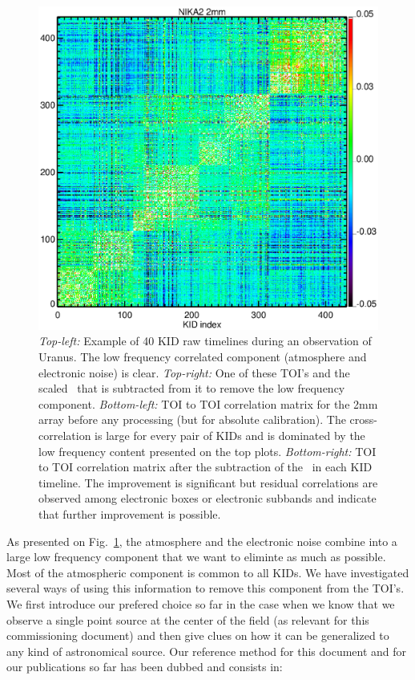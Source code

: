 \begin{figure}[hhh]
\begin{center}
\includegraphics[clip, angle=0, scale=0.4]{Figures/matrix_2mm_decorr.eps}
\caption{\emph{Top-left:} Example of 40 KID raw timelines during an observation
  of Uranus. The low frequency correlated component (atmosphere and electronic
  noise) is clear. \emph{Top-right:} One of these TOI's and the scaled
\cm\ that is subtracted from it to remove the low frequency
component. \emph{Bottom-left:} TOI to TOI correlation matrix for the 2mm array
before any processing (but for absolute calibration). The cross-correlation is
large for every pair of KIDs and is dominated by the low frequency content
presented on the top plots. \emph{Bottom-right:} TOI to TOI correlation matrix
after the subtraction of the \cm\ in each KID timeline. The improvement is
significant but residual correlations are observed among electronic boxes or
electronic subbands and indicate that further improvement is possible.}
\label{fig:nika_toi}
\end{center}
\end{figure}

As presented on Fig.~\ref{fig:nika_toi}, the atmosphere and the electronic noise
combine into a large low frequency component that we want to eliminte as much as
possible. Most of the atmospheric component is common to all KIDs. We have
investigated several ways of using this information to remove this component
from the TOI's. We first introduce our prefered choice so far in the case when
we know that we observe a single point source at the center of the field (as
relevant for this commissioning document) and then give clues on how it can be
generalized to any kind of astronomical source. Our reference method for this
document and for our publications so far has been dubbed \cmoneb and consists
in:

